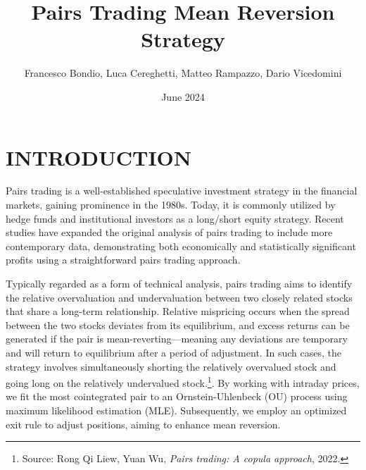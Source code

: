 \documentclass{article}
\title{Pairs Trading Mean Reversion Strategy}
\author{Francesco Bondio, Luca Cereghetti, Matteo Rampazzo, Dario Vicedomini}
\date{June 2024}
\begin{document}

\maketitle  %





\section{INTRODUCTION}
Pairs trading is a well-established speculative investment strategy in the financial markets, gaining prominence in the 1980s. Today, it is commonly utilized by hedge funds and institutional investors as a long/short equity strategy. Recent studies have expanded the original analysis of pairs trading to include more contemporary data, demonstrating both economically and statistically significant profits using a straightforward pairs trading approach. 

Typically regarded as a form of technical analysis, pairs trading aims to identify the relative overvaluation and undervaluation between two closely related stocks that share a long-term relationship. Relative mispricing occurs when the spread between the two stocks deviates from its equilibrium, and excess returns can be generated if the pair is mean-reverting—meaning any deviations are temporary and will return to equilibrium after a period of adjustment. In such cases, the strategy involves simultaneously shorting the relatively overvalued stock and going long on the relatively undervalued stock.\footnote{Source: Rong Qi Liew, Yuan Wu, \textit{Pairs trading: A copula approach}, 2022.}. By working with intraday prices, we fit the most cointegrated pair to an Ornstein-Uhlenbeck (OU) process using maximum likelihood estimation (MLE). Subsequently, we employ an optimized exit rule to adjust positions, aiming to enhance mean reversion.
\end{document}
